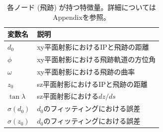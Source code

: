 \begin{table}[H]
\centering
 \begin{tabular}{ l  l }
 \hline
 変数名 & 説明\\
 \hline
 \hline
 $d_0$ & xy平面射影におけるIPと飛跡の距離\\
 $\phi$ & xy平面射影における飛跡軌道の方位角\\
 $\omega$ & xy平面射影における飛跡の曲率\\
 $z_0$ & sz平面射影におけるIPと飛跡の距離\\
 $\tan{\lambda}$ &  sz平面射影における$dz/ds$\\
 $\sigma(d_0)$ & $d_0$のフィッティングにおける誤差\\
 $\sigma(z_0)$ & $d_0$のフィッティングにおける誤差\\
 \hline
 \end{tabular}
 \label{gnninput}
 \caption{各ノード (飛跡) が持つ特徴量。詳細についてはAppendixを参照。}
\end{table}

